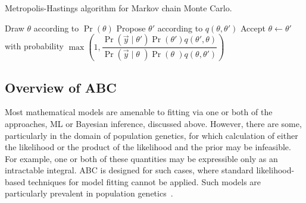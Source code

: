 \begin{algorithm}
  \caption{Metropolis-Hastings algorithm for Markov chain Monte Carlo.}
  \begin{algorithmic}
    \State Draw $\theta$ according to $\Pr(\theta)$
    \Loop
      \State Propose $\theta'$ according to $q(\theta, \theta')$
      \State Accept $\theta \gets \theta'$ with probability
      $\max \left( 1, 
       \dfrac{\Pr(\vec{y} \mid \theta') \Pr(\theta') q(\theta', \theta)}
             {\Pr(\vec{y} \mid \theta\phantom{'}) \Pr(\theta\phantom{'}) q(\theta, \theta')}
       \right)$
    \EndLoop
  \end{algorithmic}
  \label{alg:mh}
\end{algorithm}

\subsection{Overview of ABC}
\label{subsec:abcoverview}

Most mathematical models are amenable to fitting via one or both of the
approaches, \gls{ML} or Bayesian inference, discussed above. However, there are
some, particularly in the domain of population genetics, for which calculation
of either the likelihood or the product of the likelihood and the prior may be
infeasible. For example, one or both of these quantities may be expressible
only as an intractable integral. \Gls{ABC} is designed for such cases, where
standard likelihood-based techniques for model fitting cannot be applied. Such
models are particularly prevalent in population
genetics~\autocite{beaumont2002approximate, beaumont2010approximate}. 

